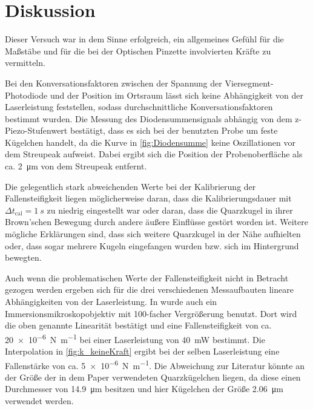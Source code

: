 \newpage
\section{Diskussion}
\label{sec:discussion}
Dieser Versuch war in dem Sinne erfolgreich, ein allgemeines Gefühl für die Maßstäbe und für die bei der Optischen Pinzette involvierten Kräfte zu vermitteln.

Bei den Konversationsfaktoren zwischen der Spannung der Viersegment-Photodiode und der Position im Ortsraum lässt sich keine Abhängigkeit von der Laserleistung feststellen, sodass durchschnittliche Konversationsfaktoren bestimmt wurden.
Die Messung des Diodensummensignals abhängig von dem z-Piezo-Stufenwert bestätigt, dass es sich bei der benutzten Probe um feste Kügelchen handelt, da die Kurve in \autoref{fig:Diodensumme} keine Oszillationen vor dem Streupeak aufweist.
Dabei ergibt sich die Position der Probenoberfläche als ca. \qty{2}{\um} von dem Streupeak entfernt.

Die gelegentlich stark abweichenden Werte bei der Kalibrierung der Fallensteifigkeit liegen möglicherweise daran, dass die Kalibrierungsdauer mit $\Delta t_{\mathrm{cal}} = \qty{1}{s}$ zu niedrig eingestellt war oder daran, dass die Quarzkugel in ihrer Brown'schen Bewegung durch andere äußere Einflüsse gestört worden ist.
Weitere mögliche Erklärungen sind, dass sich weitere Quarzkugel in der Nähe aufhielten oder, dass sogar mehrere Kugeln eingefangen wurden bzw. sich im Hintergrund bewegten.

Auch wenn die problematischen Werte der Fallensteifigkeit nicht in Betracht gezogen werden ergeben sich für die drei verschiedenen Messaufbauten lineare Abhängigkeiten von der Laserleistung.
In \cite{measurement_of_optical_trapping_force_stiffness} wurde auch ein Immersionsmikroskopobjektiv mit 100-facher Vergrößerung benutzt.
Dort wird die oben genannte Linearität bestätigt und eine Fallensteifigkeit von ca. \qty{20e-6}{\newton\per\metre} bei einer Laserleistung von \qty{40}{mW} bestimmt.
Die Interpolation in \autoref{fig:k_keineKraft} ergibt bei der selben Laserleistung eine Fallenstärke von ca. \qty{5e-6}{\newton\per\metre}.
Die Abweichung zur Literatur könnte an der Größe der in dem Paper verwendeten Quarzkügelchen liegen, da diese einen Durchmesser von \qty{14.9}{\um} besitzen und hier Kügelchen der Größe \qty{2.06}{\um} verwendet werden.

